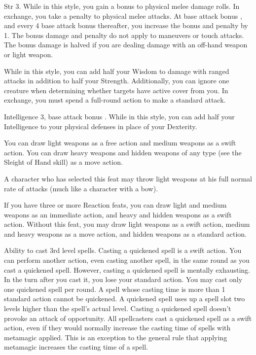  Str 3.
 While in this style, you gain a  bonus to physical melee damage rolls. In exchange, you take a  penalty to physical melee attacks. At base attack bonus , and every 4 base attack bonus thereafter, you increase the bonus and penalty by 1. The bonus damage and penalty do not apply to maneuvers or touch attacks. The bonus damage is halved if you are dealing damage with an off-hand weapon or light weapon.

 While in this style, you can add half your Wisdom to damage with ranged attacks in addition to half your Strength. Additionally, you can ignore one creature when determining whether targets have active cover from you. In exchange, you must spend a full-round action to make a standard attack.

\featpre Intelligence 3, base attack bonus .
\featben While in this style, you can add half your Intelligence to your physical defenses in place of your Dexterity.

 You can draw light weapons as a free action and medium weapons as a swift action. You can draw heavy weapons and hidden weapons of any type (see the Sleight of Hand skill) as a move action.
\par A character who has selected this feat may throw light weapons at his full normal rate of attacks (much like a character with a bow).

If you have three or more Reaction feats, you can draw light and medium weapons as an immediate action, and heavy and hidden weapons as a swift action.
 Without this feat, you may draw light weapons as a swift action, medium and heavy weapons as a move action, and hidden weapons as a standard action.

\label{Quicken Spell}
 Ability to cast 3rd level spells.
 Casting a quickened spell is a swift action. You can perform another action, even casting another spell, in the same round as you cast a quickened spell. However, casting a quickened spell is mentally exhausting. In the turn after you cast it, you lose your standard action. You may cast only one quickened spell per round. A spell whose casting time is more than 1 standard action cannot be quickened. A quickened spell uses up a spell slot two levels higher than the spell's actual level. Casting a quickened spell doesn't provoke an attack of opportunity.
 All spellcasters cast a quickened spell as a swift action, even if they would normally increase the casting time of spells with metamagic applied. This is an exception to the general rule that applying metamagic increases the casting time of a spell.

